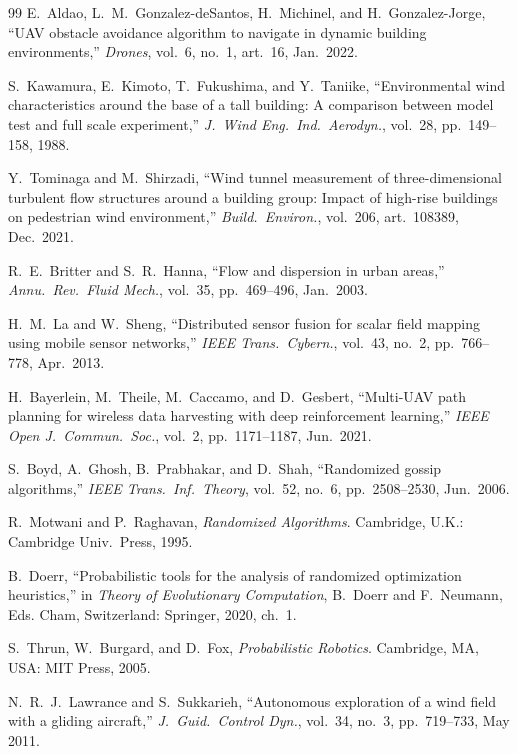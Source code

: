 \documentclass[conference]{IEEEtran}
\begin{document}
\begin{thebibliography}{99}
E.\ Aldao, L.\ M.\ Gonzalez-deSantos, H.\ Michinel, and H.\ Gonzalez-Jorge,
``UAV obstacle avoidance algorithm to navigate in dynamic
building environments,'' \emph{Drones}, vol.~6, no.~1, art.~16, Jan.\ 2022.

S.\ Kawamura, E.\ Kimoto, T.\ Fukushima, and Y.\ Taniike, ``Environmental
wind characteristics around the base of a tall building: A comparison
between model test and full scale experiment,'' \emph{J.\ Wind Eng.\ Ind.\
Aerodyn.}, vol.~28, pp.~149--158, 1988.

Y.\ Tominaga and M.\ Shirzadi, ``Wind tunnel measurement of three-dimensional turbulent flow structures around a building group: Impact
of high-rise buildings on pedestrian wind environment,'' \emph{Build.\ Environ.},
vol.~206, art.~108389, Dec.\ 2021.

R.\ E.\ Britter and S.\ R.\ Hanna, ``Flow and dispersion in urban areas,''
\emph{Annu.\ Rev.\ Fluid Mech.}, vol.~35, pp.~469--496, Jan.\ 2003.

H.\ M.\ La and W.\ Sheng, ``Distributed sensor fusion for scalar field
mapping using mobile sensor networks,'' \emph{IEEE Trans.\ Cybern.}, vol.~43,
no.~2, pp.~766--778, Apr.\ 2013.

H.\ Bayerlein, M.\ Theile, M.\ Caccamo, and D.\ Gesbert, ``Multi-UAV path
planning for wireless data harvesting with deep reinforcement learning,''
\emph{IEEE Open J.\ Commun.\ Soc.}, vol.~2, pp.~1171--1187, Jun.\ 2021.

S.\ Boyd, A.\ Ghosh, B.\ Prabhakar, and D.\ Shah, ``Randomized gossip
algorithms,'' \emph{IEEE Trans.\ Inf.\ Theory}, vol.~52, no.~6, pp.~2508--2530,
Jun.\ 2006.

R.\ Motwani and P.\ Raghavan, \emph{Randomized Algorithms}. Cambridge,
U.K.: Cambridge Univ.\ Press, 1995.

B.\ Doerr, ``Probabilistic tools for the analysis of randomized optimization
heuristics,'' in \emph{Theory of Evolutionary Computation}, B.\ Doerr and F.\
Neumann, Eds. Cham, Switzerland: Springer, 2020, ch.~1.

S.\ Thrun, W.\ Burgard, and D.\ Fox, \emph{Probabilistic Robotics}. Cambridge,
MA, USA: MIT Press, 2005.

N.\ R.\ J.\ Lawrance and S.\ Sukkarieh, ``Autonomous exploration of a
wind field with a gliding aircraft,'' \emph{J.\ Guid.\ Control Dyn.}, vol.~34, no.~3,
pp.~719--733, May 2011.


\end{thebibliography}
\end{document}
